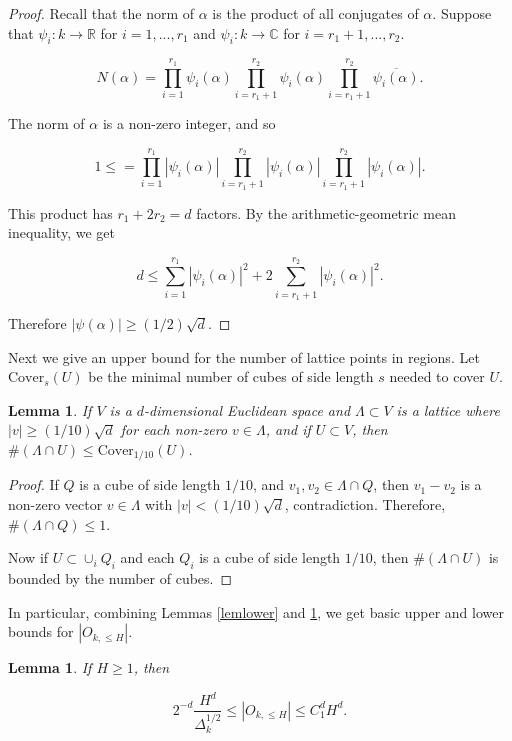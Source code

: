 \documentclass{amsart}
\newtheorem{lemma}[prop]{Lemma}
\newcommand{\CC}{\mathbb{C}}
\newcommand{\RR}{\mathbb{R}}
\newcommand{\Cover}{\textrm{Cover}}
\begin{document}
\begin{proof}  Recall that the norm of $\alpha$ is the product of all conjugates of $\alpha$.  Suppose that $\psi_i: k \rightarrow \RR$ for $i = 1, ..., r_1$ and $\psi_i: k \rightarrow \CC$ for $i = r_1 + 1, ..., r_2$. 

$$ N(\alpha) = \prod_{i=1}^{r_1} \psi_i (\alpha) \prod_{i=r_1+1}^{r_2}  \psi_i(\alpha)  \prod_{i=r_1+1}^{r_2}  \overline{ \psi_i(\alpha) } . $$

The norm of $\alpha$ is a non-zero integer,  and so 

$$ 1 \le = \prod_{i=1}^{r_1} |\psi_i (\alpha)| \prod_{i=r_1+1}^{r_2} | \psi_i(\alpha) | \prod_{i=r_1+1}^{r_2}  | \psi_i(\alpha)| . $$
  
  
This product has $r_1 + 2 r_2 = d$ factors.  By the arithmetic-geometric mean inequality,  we get

$$ d \le \sum_{i=1}^{r_1} |\psi_i(\alpha)|^2 + 2 \sum_{i=r_1+1}^{r_2} |\psi_i(\alpha)|^2. $$

Therefore $|\psi(\alpha)|  \ge (1/2) \sqrt{d}$.
\end{proof}

Next we give an upper bound for the number of lattice points in regions.   Let $\Cover_s(U)$ be the minimal number of cubes of side length $s$ needed to cover $U$.  

\begin{lemma} \label{lemupper} If $V$ is a $d$-dimensional Euclidean space and $\Lambda \subset V$ is a lattice where $|v| \ge (1/10) \sqrt d$ for each non-zero $v \in \Lambda$, and if $U \subset V$,  then $ \# (\Lambda \cap U) \le \Cover_{1/10}(U)$. 

\end{lemma}

\begin{proof} If $Q$ is a cube of side length $1/10$, and $v_1, v_2 \in \Lambda \cap Q$, then $v_1 - v_2$ is a non-zero vector $v \in \Lambda$ with $|v| < (1/10) \sqrt{d}$, contradiction.  Therefore, $\# (\Lambda \cap Q) \le 1$.

Now if $U \subset \cup_i Q_i$ and each $Q_i$ is a cube of side length $1/10$, then $\# (\Lambda \cap U)$ is bounded by the number of cubes.

\end{proof}

In particular, combining Lemmas \ref{lemlower} and \ref{lemupper}, we get basic upper and lower bounds for $|O_{k, \le H}|$.  

\begin{lemma} \label{lemsizeOkH}
If $H \ge 1$, then

\begin{equation} \label{sizeOkH}
2^{-d} \frac{H^d}{\Delta_k^{1/2}} \le |O_{k, \le H} | \le C_1^d H^d. 
\end{equation}

\end{lemma}
\end{document}
